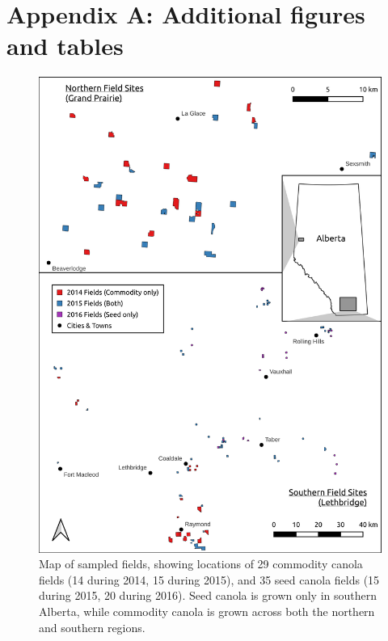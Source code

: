 \setcounter{equation}{0} %
\setcounter{figure}{0}
\setcounter{table}{0}
\makeatletter
\renewcommand{\theequation}{S\arabic{equation}} %
\renewcommand{\thefigure}{S\arabic{figure}}
\renewcommand{\thetable}{S\arabic{table}}
\renewcommand{\bibnumfmt}[1]{[S#1]}
\renewcommand{\citenumfont}[1]{S#1}

\clearpage
\section*{Appendix A: Additional figures and tables}

\begin{figure}
    \centering
    \includegraphics[width=\textwidth,keepaspectratio=true]{../Figures/FieldLocations.png}
    \caption{Map of sampled fields, showing locations of 29 commodity canola fields (14 during 2014, 15 during 2015), and 35 seed canola fields (15 during 2015, 20 during 2016). Seed canola is grown only in southern Alberta, while commodity canola is grown across both the northern and southern regions.}
    \label{fig:fieldMap}
\end{figure}


